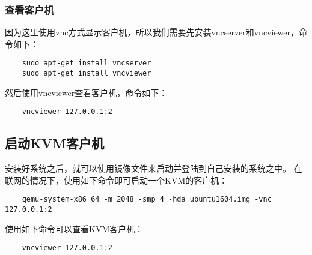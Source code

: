 \documentclass[a4paper,left=2.5cm,right=2.5cm,11pt]{article}
\begin{document}
\subsubsection{查看客户机}
	因为这里使用vnc方式显示客户机，所以我们需要先安装vncserver和vncviewer，命令如下：
	\begin{lstlisting}
	sudo apt-get install vncserver
	sudo apt-get install vncviewer
	\end{lstlisting}

	然后使用vncviewer查看客户机，命令如下：
	\begin{lstlisting}
	vncviewer 127.0.0.1:2
	\end{lstlisting}

\subsection{启动KVM客户机}
	安装好系统之后，就可以使用镜像文件来启动并登陆到自己安装的系统之中。
	在联网的情况下，使用如下命令即可启动一个KVM的客户机：
	\begin{lstlisting}
	qemu-system-x86_64 -m 2048 -smp 4 -hda ubuntu1604.img -vnc 127.0.0.1:2
	\end{lstlisting}

	使用如下命令可以查看KVM客户机：
	\begin{lstlisting}
	vncviewer 127.0.0.1:2
	\end{lstlisting}
\end{document}
